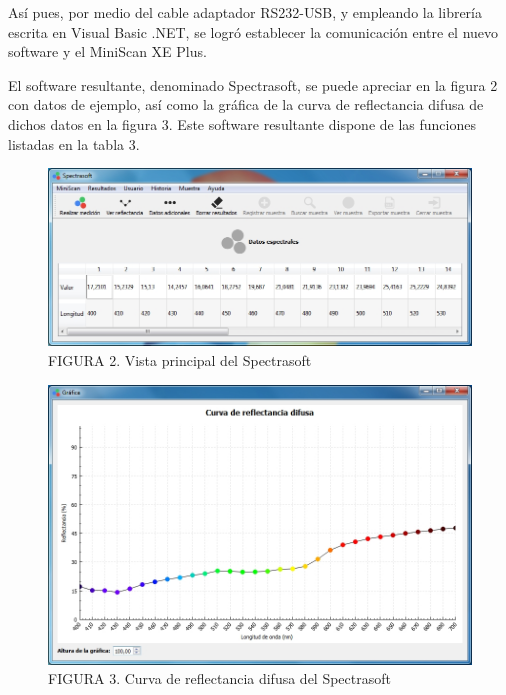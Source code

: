 \documentclass[conference]{IEEEtran}
\begin{document}
	As\'{i} pues, por medio del cable adaptador RS232-USB, y empleando la librer\'{i}a escrita en Visual Basic .NET, se logr\'{o} establecer la comunicaci\'{o}n entre el nuevo software y el MiniScan XE Plus.
	
	El software resultante, denominado Spectrasoft, se puede apreciar en la figura 2 con datos de ejemplo, as\'{i} como la gr\'{a}fica de la curva de reflectancia difusa de dichos datos en la figura 3. Este software resultante dispone de las funciones listadas en la tabla 3.

\FloatBarrier

\begin{figure}[h]
  \includegraphics[scale=.8]{./img/spectrasoft.jpg}
  \caption{FIGURA 2. Vista principal del Spectrasoft}
\end{figure}

\FloatBarrier

\begin{figure}[h]
  \includegraphics[scale=.375]{./img/curva-reflectancia.jpg}
  \caption{FIGURA 3. Curva de reflectancia difusa del Spectrasoft}
\end{figure}
	
\end{document}
